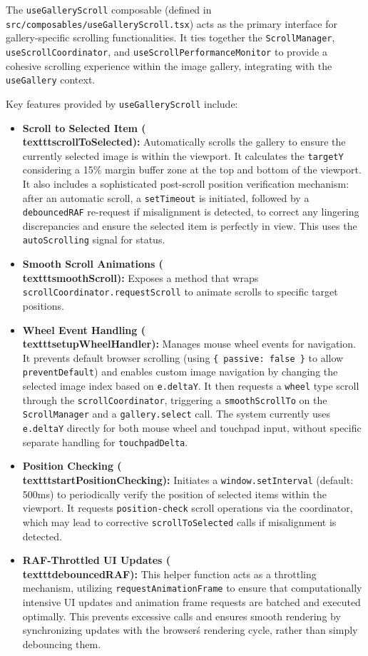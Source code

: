 \documentclass[10pt]{article}
\begin{document}
The \texttt{useGalleryScroll} composable (defined in \texttt{src/composables/useGalleryScroll.tsx}) acts as the primary interface for gallery-specific scrolling functionalities. It ties together the \texttt{ScrollManager}, \texttt{useScrollCoordinator}, and \texttt{useScrollPerformanceMonitor} to provide a cohesive scrolling experience within the image gallery, integrating with the \texttt{useGallery} context.

Key features provided by \texttt{useGalleryScroll} include:
\begin{itemize}
    \item \textbf{Scroll to Selected Item (\\texttt{scrollToSelected}):} Automatically scrolls the gallery to ensure the currently selected image is within the viewport. It calculates the \texttt{targetY} considering a 15\% margin buffer zone at the top and bottom of the viewport. It also includes a sophisticated post-scroll position verification mechanism: after an automatic scroll, a \texttt{setTimeout} is initiated, followed by a \texttt{debouncedRAF} re-request if misalignment is detected, to correct any lingering discrepancies and ensure the selected item is perfectly in view. This uses the \texttt{autoScrolling} signal for status.
    \item \textbf{Smooth Scroll Animations (\\texttt{smoothScroll}):} Exposes a method that wraps \texttt{scrollCoordinator.requestScroll} to animate scrolls to specific target positions.
    \item \textbf{Wheel Event Handling (\\texttt{setupWheelHandler}):} Manages mouse wheel events for navigation. It prevents default browser scrolling (using \texttt{\{ passive: false \}} to allow \texttt{preventDefault}) and enables custom image navigation by changing the selected image index based on \texttt{e.deltaY}. It then requests a \texttt{wheel} type scroll through the \texttt{scrollCoordinator}, triggering a \texttt{smoothScrollTo} on the \texttt{ScrollManager} and a \texttt{gallery.select} call. The system currently uses \texttt{e.deltaY} directly for both mouse wheel and touchpad input, without specific separate handling for \texttt{touchpadDelta}.
    \item \textbf{Position Checking (\\texttt{startPositionChecking}):} Initiates a \texttt{window.setInterval} (default: 500ms) to periodically verify the position of selected items within the viewport. It requests \texttt{position-check} scroll operations via the coordinator, which may lead to corrective \texttt{scrollToSelected} calls if misalignment is detected.
    \item \textbf{RAF-Throttled UI Updates (\\texttt{debouncedRAF}):} This helper function acts as a throttling mechanism, utilizing \texttt{requestAnimationFrame} to ensure that computationally intensive UI updates and animation frame requests are batched and executed optimally. This prevents excessive calls and ensures smooth rendering by synchronizing updates with the browser\'s rendering cycle, rather than simply debouncing them.
\end{itemize}
\end{document}
